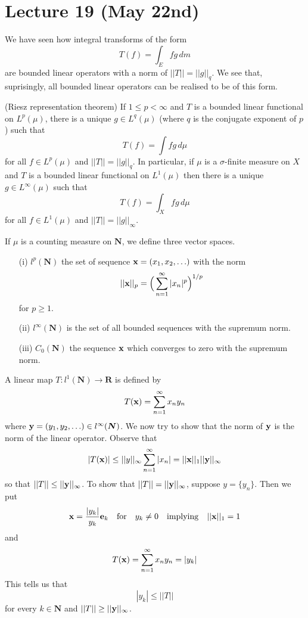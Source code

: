 \section{Lecture 19 (May 22nd)}
\begin{recall}
We have seen how integral transforms of the form
\[T(f)=\int _{E}fg\,d m\]
are bounded linear operators with a norm of $||T||=||g||_{q}$. We see that, suprisingly, all bounded linear operators can be realised to be of this form.
\end{recall}
\vspace{2ex}
\begin{thm}
(Riesz representation theorem) If $1\leq p <\infty $ and $T$ is a bounded linear functional on $L^{p}(\mu )$, there is a unique $g\in L^{q}(\mu )$ (where $q$ is the conjugate exponent of $p$) such that 
\[T(f)=\int fg\,d \mu \]
for all $f\in L^{p}(\mu )$ and $||T||=||g||_{q}$. In particular, if $\mu $ is a $\sigma $-finite measure on $X$ and $T$ is a bounded linear functional on $L^{1}(\mu )$ then there is a unique $g\in L^{\infty }(\mu )$ such that 
\[T(f)=\int _{X}fg\,d \mu \]
for all $f\in L^{1}(\mu )$ and $||T||=||g||_{\infty }$.
\end{thm}
\vspace{2ex}
\begin{defi}
If $\mu $ is a counting measure on ${\bm N}$, we define three vector spaces. 
\begin{itemize}
\item [(i)] $l^{p}({\bm N})$ the set of sequence ${\bf x}=(x_1,x_2,\ldots )$ with the norm 
\[||{\bf x}||_{p}=\Big(\sum ^{\infty }_{n=1}|x_{n}|^{p}\Big)^{1/p}\]
for $p\geq 1$. 
\item [(ii)] $l^{\infty }({\bm N})$ is the set of all bounded sequences with the supremum norm.
\item[(iii)] $C_{0}({\bm N})$ the sequence ${\bf x}$ which converges to zero with the supremum norm.
\end{itemize}
\end{defi}
\vspace{2ex}
\begin{defi}
A linear map $T:l^{1}({\bm N})\rightarrow {\bm R}$ is defined by
\[T({\bf x})=\sum ^{\infty }_{n=1}x_{n}y_{n}\]
where ${\bf y}=(y_1,y_2,\ldots )\in l^{\infty }({\bm N})$. We now try to show that the norm of ${\bf y}$ is the norm of the linear operator. Observe that
\[|T({\bf x})|\leq ||y||_{\infty }\sum ^{\infty }_{n=1}|x_{n}|=||{\bf x}||_{1}||{\bf y}||_{\infty }\]
so that $||T||\leq ||{\bf y}||_{\infty }$. To show that $||T||=||{\bf y}||_{\infty }$, suppose $y=\{y_{n}  \}$. Then we put 
\[{\bf x}=\dfrac{|y_{k}|}{y_{k}}{\bf e}_{k}\quad\mathrm{for}\quad y_{k}\ne 0\quad \mathrm{implying}\quad ||{\bf x}||_{1}=1\]
and
\[T({\bf x})= \sum ^{\infty }_{n=1}x_{n}y_{n}=|y_{k}|\]
This tells us that 
\[|y_k|\leq ||T||\]
for every $k\in {\bm N}$ and $||T||\geq ||{\bf y}||_{\infty }$.
\end{defi}
